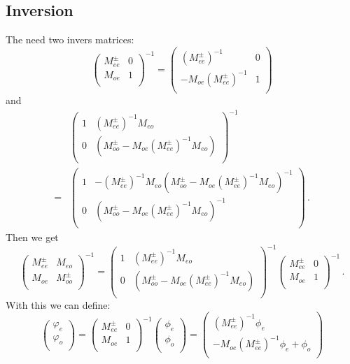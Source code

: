 \subsection{Inversion}

The need two invers matrices:
\[
\begin{pmatrix}
  M_{ee}^\pm & 0 \\
  M_{oe}   & 1 \\
\end{pmatrix}^{-1}
=
\begin{pmatrix}
      (M_{ee}^\pm)^{-1} & 0 \\
      -M_{oe} (M_{ee}^{\pm})^{-1}  & 1 \\
    \end{pmatrix}
\]
and 
\[
\begin{split}
  &\begin{pmatrix}
    1       & (M_{ee}^\pm)^{-1}M_{eo}\\
    0       & (M_{oo}^\pm-M_{oe}(M_{ee}^\pm)^{-1}M_{eo})\\
  \end{pmatrix}^{-1}
  \\=&
  \begin{pmatrix}
    1       & -(M_{ee}^\pm)^{-1}M_{eo}(M_{oo}^\pm-M_{oe}(M_{ee}^\pm)^{-1}M_{eo})^{-1}  \\
    0       & (M_{oo}^\pm-M_{oe}(M_{ee}^\pm)^{-1}M_{eo})^{-1}\\
  \end{pmatrix}\, .
\end{split}
\]
Then we get
\[
\begin{pmatrix}
  M_{ee}^\pm & M_{eo} \\
  M_{oe}    & M_{oo}^\pm \\
\end{pmatrix}^{-1}
=
\begin{pmatrix}
  1       & (M_{ee}^\pm)^{-1}M_{eo}\\
  0       & (M_{oo}^\pm-M_{oe}(M_{ee}^\pm)^{-1}M_{eo})\\
\end{pmatrix}^{-1}
\begin{pmatrix}
  M_{ee}^\pm & 0 \\
  M_{oe}   & 1 \\
\end{pmatrix}^{-1}\, .
\]
With this we can define:
\[
\begin{pmatrix}
  \varphi_e \\ \varphi_o\\
\end{pmatrix}
=
\begin{pmatrix}
  M_{ee}^\pm & 0 \\
  M_{oe}   & 1 \\
\end{pmatrix}^{-1}
\begin{pmatrix}
  \phi_e \\ \phi_o \\
\end{pmatrix}
=
\begin{pmatrix}
  (M_{ee}^\pm)^{-1} \phi_e \\ 
  -M_{oe}( M_{ee}^\pm)^{-1} \phi_e + \phi_o \\
\end{pmatrix}
\]
